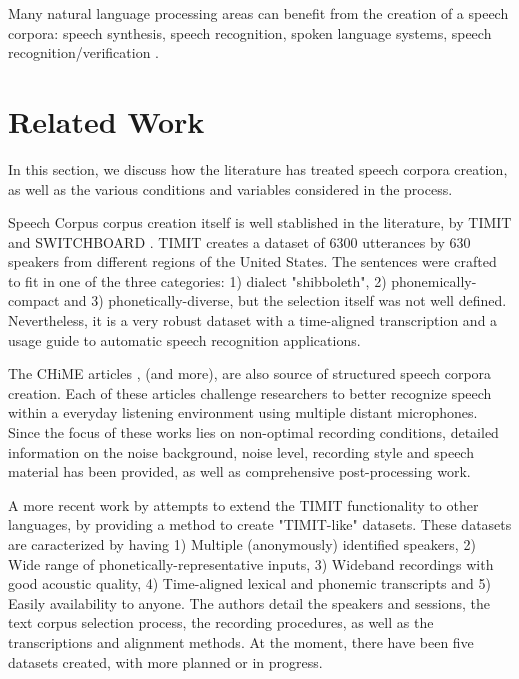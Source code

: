 \documentclass[conference]{IEEEtran}
\begin{document}
Many natural language processing areas can benefit from the creation of a speech corpora: speech synthesis, speech recognition, spoken language systems, speech recognition/verification \cite{gibbon1997handbook}.

\section[Related Work]{Related Work}

In this section, we discuss how the literature has treated speech corpora creation, as well as the various conditions and variables considered in the process.

Speech Corpus corpus creation itself is well stablished in the literature, by TIMIT \cite{Lamel1992timmit} and SWITCHBOARD \cite{godfrey1992switchboard}. TIMIT creates a dataset of 6300 utterances by 630 speakers from different regions of the United States. The sentences were crafted to fit in one of the three categories: 1) dialect "shibboleth", 2) phonemically-compact and 3) phonetically-diverse, but the selection itself was not well defined. Nevertheless, it is a very robust dataset with a time-aligned transcription and a usage guide to automatic speech recognition applications. 

The CHiME articles \cite{christensen2010chime} \cite{barker2013pascal}, \cite{barker2018fifth} (and more), are also source of structured speech corpora creation. Each of these articles challenge researchers to better recognize speech within a everyday listening environment using multiple distant microphones. Since the focus of these works lies on non-optimal recording conditions, detailed information on the noise background, noise level, recording style and speech material has been provided, as well as comprehensive post-processing work.

A more recent work by \cite{chanchaochai2018globaltimit} attempts to extend the TIMIT functionality to other languages, by providing a method to create "TIMIT-like" datasets. These datasets are caracterized by having 1) Multiple (anonymously) identified speakers, 2) Wide range of phonetically-representative inputs, 3) Wideband recordings with good acoustic quality, 4) Time-aligned lexical and phonemic transcripts and 5) Easily availability to anyone. The authors detail the speakers and sessions, the text corpus selection process, the recording procedures, as well as the transcriptions and alignment methods. At the moment, there have been five datasets created, with more planned or in progress.
\end{document}
